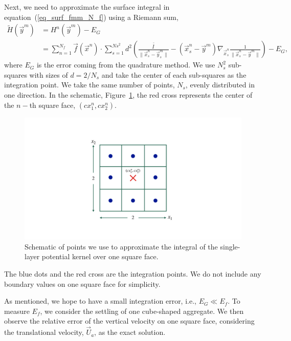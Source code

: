\par
Next, we need to approximate the surface integral in equation~(\ref{eq_surf_fmm_N_f}) using a Riemann sum,
\begin{align}
	\tilde{H}(\vec{y}^m) 
	& = H^n(\vec{y}^m) - E_{G} 
	\nonumber \\ 
	& =
	\sum_{n = 1}^{N_f} 
	\vec{f}(\vec{x}^n) \cdot
	\sum_{s=1}^{Ns^2} d^2 
  	\left(
  	\frac{\bar{\bar{I \ }}}{\|\vec{x}_s^n - \vec{y}_s^m\|}
  	- \left( \vec{x}_s^n - \vec{y}^m \right)
  	 \nabla_{\vec{x}_s^n}
  	\frac{1}{\|\vec{x}_s^n - \vec{y}^m\|}
  	\right)
	  - E_{G},
 \label{eq_surf_fmm_N_f_n}
\end{align}
where $E_G$ is the error coming from the quadrature method. 
We use $N_s^2$ sub-squares with sizes of $d = 2/N_s$ and take the center of each sub-squares as the integration point. 
We take the same number of points, $N_s$, evenly distributed in one direction. 
In the schematic, Figure~\ref{fig_face_grid}, the red cross represents the center of the $n-$th square face, $(cx^n_1, cx^n_2)$.
\begin{figure}[h]
	\begin{center}
		\includegraphics[scale=0.2]{./figures/fig_face_grid}
	\caption{Schematic of points we use to approximate the integral of the single-layer potential kernel over one square face.}
	\label{fig_face_grid}
\end{center}
\end{figure}
The blue dots and the red cross are the integration points.
We do not include any boundary values on one square face for simplicity.
\par
As mentioned, we hope to have a small integration error, i.e., $E_G \ll E_f$.
To measure $E_f$, we consider the settling of one cube-shaped aggregate.
We then observe the relative error of the vertical velocity on one square face, considering the translational velocity, $\vec{U}_a$, as the exact solution.
